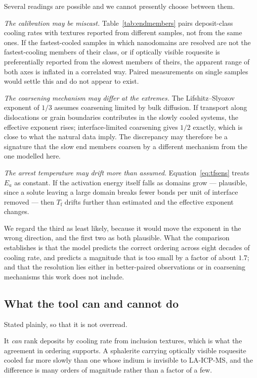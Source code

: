\documentclass[preprint,12pt,authoryear]{elsarticle}
\newcommand{\Tf}{T_{\mathrm{f}}}
\begin{document}
Several readings are possible and we cannot presently choose between them.

\emph{The calibration may be miscast.} Table~\ref{tab:endmembers} pairs
deposit-class cooling rates with textures reported from different samples, not
from the same ones. If the fastest-cooled samples in which nanodomains are
resolved are not the fastest-cooling members of their class, or if optically
visible roquesite is preferentially reported from the slowest members of theirs,
the apparent range of both axes is inflated in a correlated way. Paired
measurements on single samples would settle this and do not appear to exist.

\emph{The coarsening mechanism may differ at the extremes.} The
Lifshitz--Slyozov exponent of $1/3$ assumes coarsening limited by bulk
diffusion. If transport along dislocations or grain boundaries contributes in
the slowly cooled systems, the effective exponent rises; interface-limited
coarsening gives $1/2$ exactly, which is close to what the natural data imply.
The discrepancy may therefore be a signature that the slow end members coarsen
by a different mechanism from the one modelled here.

\emph{The arrest temperature may drift more than assumed.}
Equation~\eqref{eq:tfsens} treats $E_a$ as constant. If the activation energy
itself falls as domains grow --- plausible, since a solute leaving a large domain
breaks fewer bonds per unit of interface removed --- then $\Tf$ drifts further
than estimated and the effective exponent changes.

We regard the third as least likely, because it would move the exponent in the
wrong direction, and the first two as both plausible. What the comparison
establishes is that the model predicts the correct ordering across eight decades
of cooling rate, and predicts a magnitude that is too small by a factor of about
$1.7$; and that the resolution lies either in better-paired observations or in
coarsening mechanisms this work does not include.

\subsection{What the tool can and cannot do}

Stated plainly, so that it is not overread.

It \emph{can} rank deposits by cooling rate from inclusion textures, which is
what the agreement in ordering supports. A sphalerite carrying optically visible
roquesite cooled far more slowly than one whose indium is invisible to
LA-ICP-MS, and the difference is many orders of magnitude rather than a factor
of a few.
\end{document}
